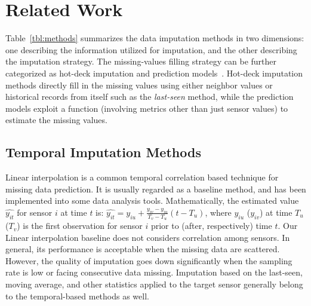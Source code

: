 \section{Related Work}\label{sec:rw}



Table~\ref{tbl:methods} summarizes the data imputation methods in two dimensions: one describing the information utilized for imputation, and the other describing the imputation strategy. The missing-values filling strategy can be further categorized as hot-deck imputation and prediction models~\cite{Garcia:KNNreview}. 
Hot-deck imputation methods directly fill in the missing values using either neighbor values or historical records from itself 
such as the \textit{last-seen} method, while the prediction models exploit a function (involving metrics other than just sensor 
values) to estimate the missing values. 



\subsection{Temporal Imputation Methods}
Linear interpolation is a common temporal correlation based technique for missing data prediction. 
It is usually regarded as a baseline method, and has been implemented into some data analysis tools. Mathematically, the estimated value $\hat{y_{it}}$ for sensor $i$ at time $t$ is:
$\hat{y_{it}} = y_{iu} + \frac{y_{iv}-y_{iu}}{T_v-T_u}(t-T_u)$, where $y_{iu}$ ($y_{iv}$) at time $T_u$ ($T_v$) is the first 
observation for sensor $i$ prior to (after, respectively) time $t$.
Our Linear interpolation baseline does not considers correlation among sensors. In general, its performance is acceptable when the missing data are scattered. 
However, the quality of imputation goes down significantly when the sampling rate is low or facing consecutive data missing. 
Imputation based on the last-seen, moving average, and other statistics applied to the target sensor generally belong to the 
temporal-based methods as well.

